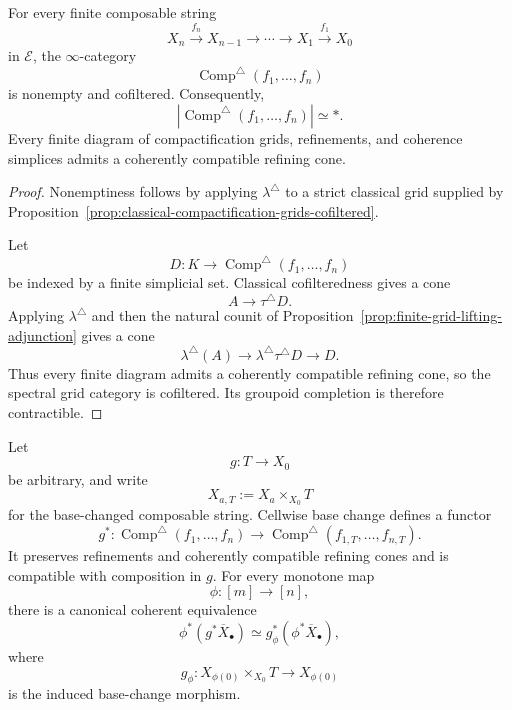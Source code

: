 \begin{theorem}
\label{thm:finite-compactification-grids}
For every finite composable string
\[
    X_n
    \xrightarrow{f_n}
    X_{n-1}
    \longrightarrow
    \cdots
    \longrightarrow
    X_1
    \xrightarrow{f_1}
    X_0
\]
in \(\mathcal E\), the \(\infty\)-category
\[
    \operatorname{Comp}^{\triangle}(f_1,\ldots,f_n)
\]
is nonempty and cofiltered.  Consequently,
\[
    \left|
      \operatorname{Comp}^{\triangle}(f_1,\ldots,f_n)
    \right|
    \simeq
    *.
\]
Every finite diagram of compactification grids, refinements, and coherence
simplices admits a coherently compatible refining cone.
\end{theorem}

\begin{proof}
Nonemptiness follows by applying \(\lambda^\triangle\) to a strict classical
grid supplied by
Proposition~\ref{prop:classical-compactification-grids-cofiltered}.

Let
\[
    D:K
    \longrightarrow
    \operatorname{Comp}^{\triangle}(f_1,\ldots,f_n)
\]
be indexed by a finite simplicial set.  Classical cofilteredness gives a
cone
\[
    A
    \longrightarrow
    \tau^\triangle D.
\]
Applying \(\lambda^\triangle\) and then the natural counit of
Proposition~\ref{prop:finite-grid-lifting-adjunction} gives a cone
\[
    \lambda^\triangle(A)
    \longrightarrow
    \lambda^\triangle\tau^\triangle D
    \longrightarrow
    D.
\]
Thus every finite diagram admits a coherently compatible refining cone, so
the spectral grid category is cofiltered.  Its groupoid completion is
therefore contractible.
\end{proof}

\begin{proposition}
\label{prop:finite-grid-base-change}
Let
\[
    g:T\longrightarrow X_0
\]
be arbitrary, and write
\[
    X_{a,T}
    :=
    X_a\times_{X_0}T
\]
for the base-changed composable string.  Cellwise base change defines a
functor
\[
    g^*:
    \operatorname{Comp}^{\triangle}(f_1,\ldots,f_n)
    \longrightarrow
    \operatorname{Comp}^{\triangle}(f_{1,T},\ldots,f_{n,T}).
\]
It preserves refinements and coherently compatible refining cones and is
compatible with composition in \(g\).  For every monotone map
\[
    \phi:[m]\longrightarrow[n],
\]
there is a canonical coherent equivalence
\[
    \phi^*(g^*\overline X_\bullet)
    \simeq
    g_\phi^*(\phi^*\overline X_\bullet),
\]
where
\[
    g_\phi:
    X_{\phi(0)}\times_{X_0}T
    \longrightarrow
    X_{\phi(0)}
\]
is the induced base-change morphism.
\end{proposition}

